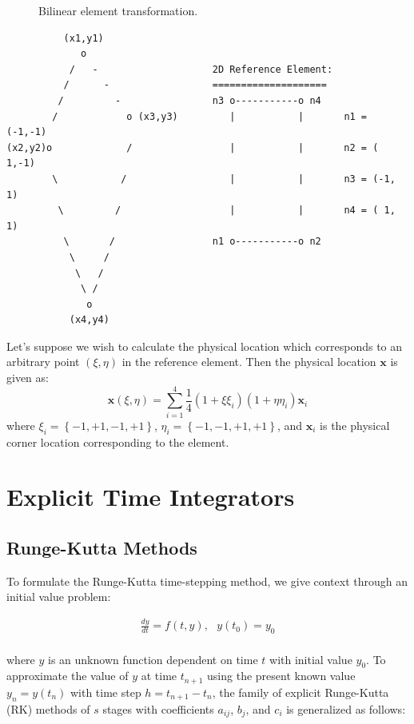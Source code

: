\documentclass[11pt]{book}
\begin{document}
\begin{appendices}
\begin{figure}[h]
 \begin{subfigmatrix}{2}%
 \end{subfigmatrix}
 \caption{Bilinear element transformation.}
 \label{bilinear-quad}
\end{figure}

\begin{verbatim}
          (x1,y1)
             o
           /   -                    2D Reference Element:
          /      -                  ====================
         /         -                n3 o-----------o n4
        /            o (x3,y3)         |           |       n1 = (-1,-1)
(x2,y2)o             /                 |           |       n2 = ( 1,-1)
        \           /                  |           |       n3 = (-1, 1)
         \         /                   |           |       n4 = ( 1, 1)
          \       /                 n1 o-----------o n2
           \     /  
            \   /
             \ /
              o 
           (x4,y4)
\end{verbatim}
Let's suppose we wish to calculate the physical location which corresponds to an arbitrary point $(\xi,\eta)$ in the reference element. Then the physical location $\mathbf{x}$ is given as:
\begin{equation*}
\mathbf{x}(\xi,\eta) =  \sum_{i=1}^{4} \frac{1}{4}\left(1 + \xi \xi_i \right) \left( 1+\eta \eta_i \right)\mathbf{x}_{i}
\end{equation*}
where $\xi_i = \left\{-1,+1,-1,+1\right\}$, $\eta_i = \left\{-1,-1,+1,+1 \right\}$, and $\mathbf{x}_{i}$ is the physical corner location corresponding to the element.


\chapter{Explicit Time Integrators}
\section{Runge-Kutta Methods}
To formulate the Runge-Kutta time-stepping method, we give context through 
an initial value problem:

\begin{eqnarray}
\frac{dy}{dt} = f(t,y),\ \ \ y(t_0) = y_0
\end{eqnarray}
\\
\noindent where $y$ is an unknown function dependent on time $t$ with 
initial value $y_0$. To approximate the value of $y$ at time $t_{n+1}$ 
using the present known value $y_{n} = y(t_n)$ with time step $h = t_{n+1} - t_n$, 
the family of explicit Runge-Kutta (RK) methods of $s$ stages with coefficients 
$a_{ij}$, $b_{j}$, and $c_{i}$ is generalized as follows: 


\end{appendices}
\end{document}
